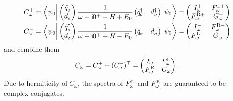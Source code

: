 \begin{subequations}
    \begin{align}
        C^+_\omega
         & =
        \biggl\langle \psi_0 \biggr|
        \begin{pmatrix}
            \tilde q^{\pdag}_\sigma \\
            d^{\pdag}_\sigma
        \end{pmatrix}
        \frac{1}{\omega + \mi0^+ - H + E_0}
        \begin{pmatrix}
            \tilde q^\dag_\sigma & d^\dag_\sigma
        \end{pmatrix}
        \biggl| \psi_0 \biggr\rangle
        =
        \begin{pmatrix}
            I^+_\omega      & F^{\mL+}_\omega \\
            F^{\mR+}_\omega & G^+_\omega
        \end{pmatrix} \\
        C^-_\omega
         & =
        \biggl\langle \psi_0 \biggr|
        \begin{pmatrix}
            \tilde q^\dag_\sigma \\
            d^\dag_\sigma
        \end{pmatrix}
        \frac{1}{\omega + \mi0^+ + H - E_0}
        \begin{pmatrix}
            \tilde q^{\pdag}_\sigma & d^{\pdag}_\sigma
        \end{pmatrix}
        \biggl| \psi_0 \biggr\rangle
        =
        \begin{pmatrix}
            I^-_\omega      & F^{\mR-}_\omega \\
            F^{\mL-}_\omega & G^-_\omega
        \end{pmatrix}
    \end{align}
\end{subequations}
and combine them
\begin{equation}
    C_\omega
    =
    C^+_\omega + (C^-_\omega)^\top
    =
    \begin{pmatrix}
        I_\omega       & F^{\mathrm{L}}_\omega \\
        F^{\mathrm{R}}_\omega & G_\omega
    \end{pmatrix}.
\end{equation}
Due to hermiticity of $C_\omega$, the spectra of $F^{\mathrm{L}}_\omega$ and $F^{\mathrm{R}}_\omega$ are
guaranteed to be complex conjugates.

